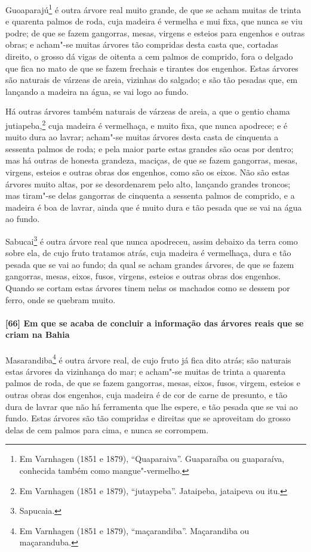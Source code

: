 Guoaparajú\footnote{ Em Varnhagen (1851 e 1879), ``Quaparaiva''. Guaparaíba ou guaparaíva,
conhecida também como mangue"-vermelho.} é outra árvore real muito grande, de que se acham
muitas de trinta e quarenta palmos de roda, cuja madeira é vermelha e mui fixa, que nunca
se viu podre; de que se fazem gangorras, mesas, virgens e esteios para engenhos e outras
obras; e acham"-se muitas árvores tão compridas desta casta que, cortadas direito, o grosso
dá vigas de oitenta a cem palmos de comprido, fora o delgado que fica no mato de que se
fazem frechais e tirantes dos engenhos. Estas árvores são naturais de várzeas de areia,
vizinhas do salgado; e são tão pesadas que, em lançando a madeira na água, se vai logo ao
fundo.

Há outras árvores também naturais de várzeas de areia, a que o gentio chama
jutiapeba,\footnote{ Em Varnhagen (1851 e 1879), ``jutaypeba''. Jataipeba, jataipeva ou
itu.} cuja madeira é vermelhaça, e muito fixa, que nunca apodrece; e é muito dura ao
lavrar; acham"-se muitas árvores desta casta de cinquenta a sessenta palmos de roda; e pela
maior parte estas grandes são ocas por dentro; mas há outras de honesta grandeza, maciças,
de que se fazem gangorras, mesas, virgens, esteios e outras obras dos engenhos, como são
os eixos. Não são estas árvores muito altas, por se desordenarem pelo alto, lançando
grandes troncos; mas tiram"-se delas gangorras de cinquenta a sessenta palmos de comprido,
e a madeira é boa de lavrar, ainda que é muito dura e tão pesada que se vai na água ao
fundo.

Sabucai\footnote{ Sapucaia.} é outra árvore real que nunca apodreceu, assim debaixo da
terra como sobre ela, de cujo fruto tratamos atrás, cuja madeira é vermelhaça, dura e tão
pesada que se vai ao fundo; da qual se acham grandes árvores, de que se fazem gangorras,
mesas, eixos, fusos, virgens, esteios e outras obras dos engenhos. Quando se cortam estas
árvores tinem nelas os machados como se dessem por ferro, onde se quebram muito.

\paragraph{[66] Em que se acaba de concluir a informação das árvores reais que se criam na
Bahia}\quad
Masarandiba\footnote{ Em Varnhagen (1851 e 1879), ``maçarandiba''. Maçarandiba ou
maçaranduba.} é outra árvore real, de cujo fruto já fica dito atrás; são naturais estas
árvores da vizinhança do mar; e acham"-se muitas de trinta a quarenta palmos de roda, de
que se fazem gangorras, mesas, eixos, fusos, virgem, esteios e outras obras dos engenhos,
cuja madeira é de cor de carne de presunto, e tão dura de lavrar que não há ferramenta que
lhe espere, e tão pesada que se vai ao fundo. Estas árvores são tão compridas e direitas
que se aproveitam do grosso delas de cem palmos para cima, e nunca se corrompem.

